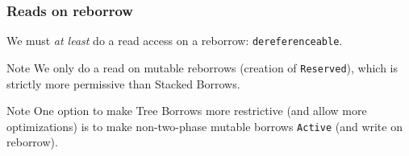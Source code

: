 \begin{frame}
    \frametitle{Reads on reborrow}
    We must \textit{at least} do a read access on a reborrow: \texttt{dereferenceable}.\\

    \begin{block}{Note}
        We only do a read on mutable reborrows (creation of \texttt{Reserved}),
        which is strictly more permissive than Stacked Borrows.
    \end{block}

    \begin{block}{Note}
        One option to make Tree Borrows more restrictive (and allow more optimizations)
        is to make non-two-phase mutable borrows \texttt{Active} (and write on reborrow).
    \end{block}
\end{frame}

